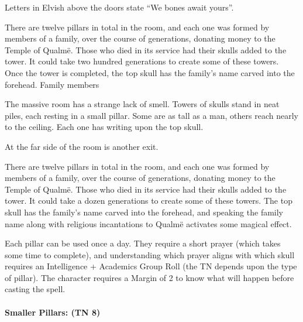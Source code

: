 \begin{multicols}{2}

\label{sewerShrine}

\begin{boxtext}
  Letters in Elvish above the doors state ``We bones await yours''.
\end{boxtext}

There are twelve pillars in total in the room, and each one was formed by members of a family, over the course of generations, donating money to the Temple of Qualm\"{e}.  Those who died in its service had their skulls added to the tower.  It could take two hundred generations to create some of these towers.  Once the tower is completed, the top skull has the family's name carved into the forehead.  Family members

\begin{boxtext}

  The massive room has a strange lack of smell.  Towers of skulls stand in neat piles, each resting in a small pillar.  Some are as tall as a man, others reach nearly to the ceiling.  Each one has writing upon the top skull.

  At the far side of the room is another exit.

\end{boxtext}

There are twelve pillars in total in the room, and each one was formed by members of a family, over the course of generations, donating money to the Temple of Qualm\"{e}.
Those who died in its service had their skulls added to the tower.
It could take a dozen generations to create some of these towers.
The top skull has the family's name carved into the forehead, and speaking the family name along with religious incantations to Qualm\"{e} activates some magical effect.

Each pillar can be used once a day.
They require a short prayer (which takes some time to complete), and understanding which prayer aligns with which skull requires an Intelligence + Academics Group Roll (the TN depends upon the type of pillar).
The character requires a Margin of 2 to know what will happen before casting the spell.

\paragraph{Smaller Pillars: (TN 8)}

\begin{enumerate}


\end{enumerate}
\end{multicols}
